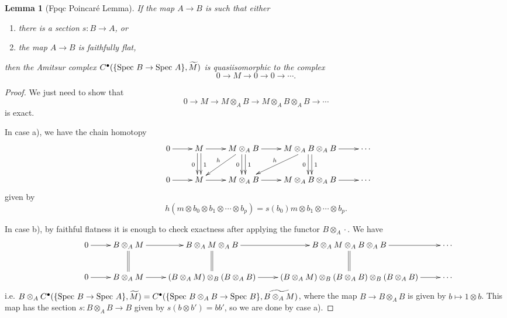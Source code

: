 \documentclass[letterpaper,11pt]{article}
\newtheorem{lem}{Lemma}
\theoremstyle{definition}
\theoremstyle{remark}
\begin{document}
\begin{lem}[Fpqc Poincar\'{e} Lemma]\label{fpqc} If the map $A \rightarrow B$ is such that either
\begin{enumerate}
\item[\rm{a)}] there is a section $s : B\rightarrow A$, or

\item[\rm{b)}] the map $A \rightarrow B$ is faithfully flat,
\end{enumerate}
then the Amitsur complex $C^\bullet(\{\mbox{\rm Spec }B\rightarrow\mbox{\rm Spec }A\},\widetilde{M})$ is quasiisomorphic to the complex
\[
0 \rightarrow M \rightarrow 0 \rightarrow 0 \rightarrow \cdots.
\]
\end{lem}
\begin{proof} We just need to show that
\[
0 \rightarrow M \rightarrow M\otimes_AB \rightarrow M\otimes_AB\otimes_AB \rightarrow \cdots
\]
is exact.

In case a), we have the chain homotopy
\begin{align*}
\xymatrix{&0 \ar[r] &M \ar@<-0.5ex>[d]_0 \ar@<0.5ex>[d]^1 \ar[r] &M\otimes_AB \ar@<-0.5ex>[d]_0 \ar@<0.5ex>[d]^1 \ar[dl]_h \ar[r] &M\otimes_AB\otimes_AB \ar@<-0.5ex>[d]_0 \ar@<0.5ex>[d]^1 \ar[dl]_h \ar[r] &\cdots \\
&0 \ar[r] &M \ar[r] &M\otimes_AB \ar[r] &M\otimes_AB\otimes_AB \ar[r] &\cdots}
\end{align*}
given by
\[
h(m\otimes b_0 \otimes b_1\otimes \cdots\otimes b_p) = s(b_0)m\otimes b_1 \otimes \cdots \otimes b_p.
\]

In case b), by faithful flatness it is enough to check exactness after applying the functor $B\otimes_A \cdot$. We have
\begin{align*}
\xymatrix{&0 \ar[r] &B\otimes_AM \ar@{=}[d] \ar[r] &B\otimes_AM\otimes_AB \ar@{=}[d] \ar[r] &B\otimes_AM\otimes_AB\otimes_AB \ar@{=}[d] \ar[r] &\cdots \\
&0 \ar[r] &B\otimes_AM \ar[r] &(B\otimes_AM)\otimes_B(B\otimes_AB) \ar[r] &(B\otimes_AM)\otimes_B(B\otimes_AB)\otimes_B(B\otimes_AB) \ar[r] &\cdots}
\end{align*}
i.e. $B\otimes_A C^\bullet(\{\mbox{\rm Spec }B\rightarrow\mbox{\rm Spec }A\},\widetilde{M}) = C^\bullet(\{\mbox{\rm Spec }B\otimes_AB\rightarrow\mbox{\rm Spec }B\},\widetilde{B\otimes_AM})$, where the map $B \rightarrow B\otimes_AB$ is given by $b \mapsto 1\otimes b$. This map has the section $s:B\otimes_AB \rightarrow B$ given by $s(b\otimes b') = bb'$, so we are done by case a).
\end{proof}
\end{document}

